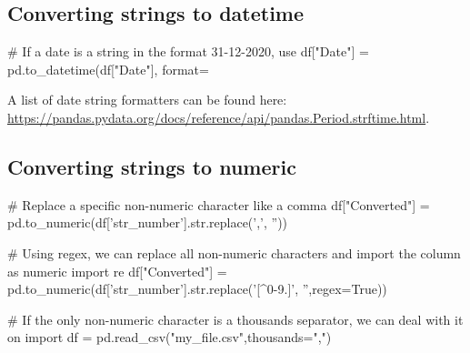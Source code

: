 \subsection{Converting strings to datetime}

\begin{pycode}
    # If a date is a string in the format 31-12-2020, use %
    df["Date"] = pd.to_datetime(df["Date"], format=%
\end{pycode}

A list of date string formatters can be found here: \url{https://pandas.pydata.org/docs/reference/api/pandas.Period.strftime.html}.

\subsection{Converting strings to numeric}

\begin{pycode}
    # Replace a specific non-numeric character like a comma
    df["Converted"] = pd.to_numeric(df['str_number'].str.replace(',', ''))

    # Using regex, we can replace all non-numeric characters and import the column as numeric
    import re
    df["Converted"] = pd.to_numeric(df['str_number'].str.replace('[^0-9.]', '',regex=True))

    # If the only non-numeric character is a thousands separator, we can deal with it on import
    df = pd.read_csv("my_file.csv",thousands=",")
\end{pycode}